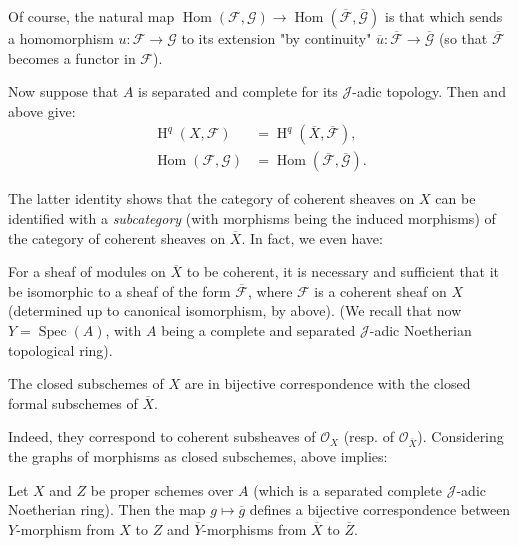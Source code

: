 Of course, the natural map $\operatorname{Hom}(\mathcal{F},\mathcal{G})\to\operatorname{Hom}(\overline{\mathcal{F}},\overline{\mathcal{G}})$ is that which sends a homomorphism $u\colon\mathcal{F}\to\mathcal{G}$ to its extension "by continuity" $\overline{u}\colon\overline{\mathcal{F}}\to\overline{\mathcal{G}}$ (so that $\overline{\mathcal{F}}$ becomes a functor in $\mathcal{F}$).

Now suppose that $A$ is separated and complete for its $\mathcal{J}$-adic topology.
Then  and  above give:
\[
    \begin{aligned}
        \operatorname{H}^q(X,\mathcal{F}) & = \operatorname{H}^q(\overline{X},\overline{\mathcal{F}}),
        \\\operatorname{Hom}(\mathcal{F},\mathcal{G}) &= \operatorname{Hom}(\overline{\mathcal{F}},\overline{\mathcal{G}}).
    \end{aligned}
\]

The latter identity shows that the category of coherent sheaves on $X$ can be identified with a \emph{subcategory} (with morphisms being the induced morphisms) of the category of coherent sheaves on $\overline{X}$.
In fact, we even have:

\begin{theorem}\label{fga2-theorem-3}
    For a sheaf of modules on $\overline{X}$ to be coherent, it is necessary and sufficient that it be isomorphic to a sheaf of the form $\overline{\mathcal{F}}$, where $\mathcal{F}$ is a coherent sheaf on $X$ (determined up to canonical isomorphism, by  above).
    (We recall that now $Y=\operatorname{Spec}(A)$, with $A$ being a complete and separated $\mathcal{J}$-adic Noetherian topological ring).
\end{theorem}

\begin{corollary}\label{fga2-theorem-3-corollary-1}
    The closed subschemes of $X$ are in bijective correspondence with the closed formal subschemes of $\overline{X}$.
\end{corollary}


Indeed, they correspond to coherent subsheaves of $\mathcal{O}_X$ (resp. of $\mathcal{O}_{\overline{X}}$).
Considering the graphs of morphisms as closed subschemes,  above implies:

\begin{corollary}\label{fga2-theorem-3-corollary-2}
    Let $X$ and $Z$ be proper schemes over $A$ (which is a separated complete $\mathcal{J}$-adic Noetherian ring).
    Then the map $g\mapsto\overline{g}$ defines a bijective correspondence between $Y$-morphism from $X$ to $Z$ and $\overline{Y}$-morphisms from $\overline{X}$ to $\overline{Z}$.
\end{corollary}

